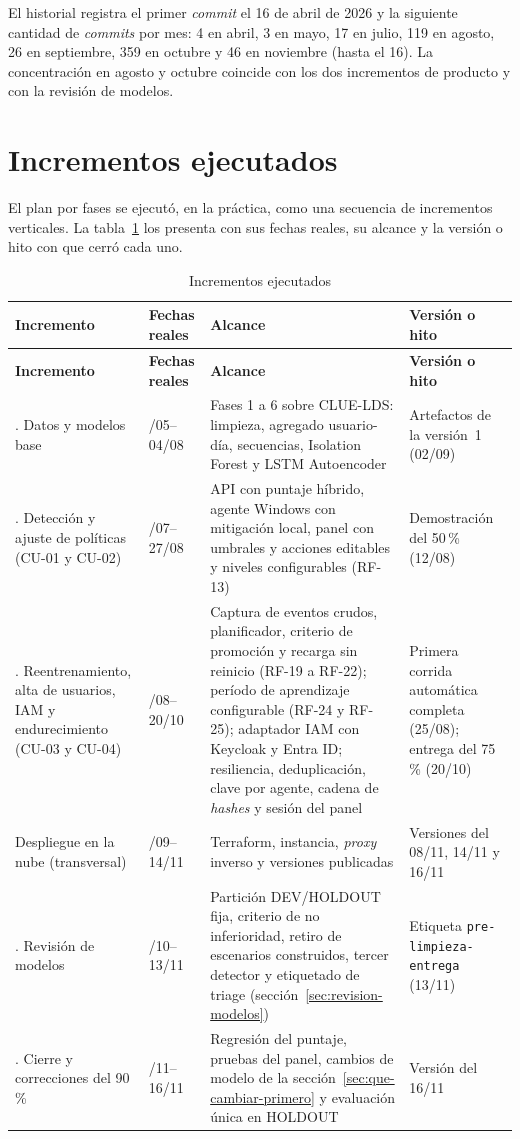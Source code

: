 El historial registra el primer \emph{commit} el 16 de abril de 2026 y la siguiente cantidad de \emph{commits} por mes: 4 en abril, 3 en mayo, 17 en julio, 119 en agosto, 26 en septiembre, 359 en octubre y 46 en noviembre (hasta el 16). La concentración en agosto y octubre coincide con los dos incrementos de producto y con la revisión de modelos.

\section{Incrementos ejecutados}
\label{sec:incrementos}
El plan por fases se ejecutó, en la práctica, como una secuencia de incrementos verticales. La tabla~\ref{tab:incrementos} los presenta con sus fechas reales, su alcance y la versión o hito con que cerró cada uno.

\begin{longtable}{>{\raggedright\arraybackslash}p{3.2cm}>{\raggedright\arraybackslash}p{2.4cm}>{\raggedright\arraybackslash}p{5.0cm}>{\raggedright\arraybackslash}p{3.4cm}}
	\caption{Incrementos ejecutados}
	\label{tab:incrementos}\\
	\hline
	\textbf{Incremento} & \textbf{Fechas reales} & \textbf{Alcance} & \textbf{Versión o hito} \\
	\hline
	\endfirsthead
	\hline
	\textbf{Incremento} & \textbf{Fechas reales} & \textbf{Alcance} & \textbf{Versión o hito} \\
	\hline
	\endhead
	0. Datos y modelos base & 03/05--04/08 & Fases 1 a 6 sobre CLUE-LDS: limpieza, agregado usuario-día, secuencias, Isolation Forest y LSTM Autoencoder & Artefactos de la versión~1 (02/09) \\
	\hline
	1. Detección y ajuste de políticas (CU-01 y CU-02) & 17/07--27/08 & API con puntaje híbrido, agente Windows con mitigación local, panel con umbrales y acciones editables y niveles configurables (RF-13) & Demostración del 50\,\% (12/08) \\
	\hline
	2. Reentrenamiento, alta de usuarios, IAM y endurecimiento (CU-03 y CU-04) & 20/08--20/10 & Captura de eventos crudos, planificador, criterio de promoción y recarga sin reinicio (RF-19 a RF-22); período de aprendizaje configurable (RF-24 y RF-25); adaptador IAM con Keycloak y Entra ID; resiliencia, deduplicación, clave por agente, cadena de \emph{hashes} y sesión del panel & Primera corrida automática completa (25/08); entrega del 75\,\% (20/10) \\
	\hline
	Despliegue en la nube (transversal) & 10/09--14/11 & Terraform, instancia, \emph{proxy} inverso y versiones publicadas & Versiones del 08/11, 14/11 y 16/11 \\
	\hline
	3. Revisión de modelos & 04/10--13/11 & Partición DEV/HOLDOUT fija, criterio de no inferioridad, retiro de escenarios construidos, tercer detector y etiquetado de triage (sección~\ref{sec:revision-modelos}) & Etiqueta \texttt{pre-limpieza-entrega} (13/11) \\
	\hline
	4. Cierre y correcciones del 90\,\% & 13/11--16/11 & Regresión del puntaje, pruebas del panel, cambios de modelo de la sección~\ref{sec:que-cambiar-primero} y evaluación única en HOLDOUT & Versión del 16/11 \\
	\hline
\end{longtable}
